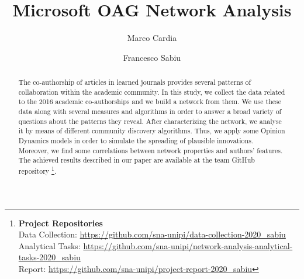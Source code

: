 \documentclass[sigchi]{acmart}
\begin{document}
%
\title{Microsoft OAG Network Analysis}

%
\author{Marco Cardia}

\author{Francesco Sabiu}

\renewcommand{\shortauthors}{Francesco Sabiu, Marco Cardia}


\begin{abstract}
The co-authorship of articles in learned journals provides several patterns of collaboration within the academic community. In this study, we collect the data related to the 2016 academic co-authorships and we build a network from them. We use these data along with several measures and algorithms in order to answer a broad variety of questions about the patterns they reveal.
After characterizing the network, we analyse it by means of different community discovery algorithms. Thus, we apply some Opinion Dynamics models in order to simulate the spreading of plausible innovations. Moreover, we find some correlations between network properties and authors' features. The achieved results described in our paper are available at the team GitHub repository
\footnote{
{\bf Project Repositories}\\
\noindent Data Collection: \url{https://github.com/sna-unipi/data-collection-2020_sabiu}\\
\noindent Analytical Tasks: \url{https://github.com/sna-unipi/network-analysis-analytical-tasks-2020_sabiu}\\
\noindent Report: \url{https://github.com/sna-unipi/project-report-2020_sabiu}}.
\end{abstract}


%


%
\maketitle
\end{document}
